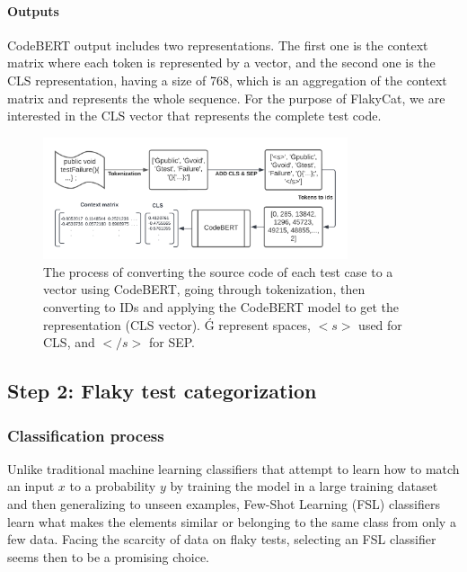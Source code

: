 \paragraph{Outputs}

CodeBERT output includes two representations. The first one is the context matrix where each token is represented by a vector, and the second one is the CLS representation, having a size of 768, which is an aggregation of the context matrix and represents the whole sequence.
For the purpose of FlakyCat, we are interested in the CLS vector that represents the complete test code.

 
\begin{figure}[htbp]
\centering
\includegraphics[width = 0.8\textwidth, scale=1]{figures/flakycat/codebert_transform.png}
\caption{The process of converting the source code of each test case to a vector using CodeBERT, going through tokenization, then converting to IDs and applying the CodeBERT model to get the representation (CLS vector). Ǵ represent spaces, $<s>$ used for CLS, and $</s>$ for SEP. }
\label{fig:using_codebert}
\end{figure}

\subsection{Step 2: Flaky test categorization}

\subsubsection{Classification process}

Unlike traditional machine learning classifiers that attempt to learn how to match an input $x$ to a probability $y$ by training the model in a large training dataset and then generalizing to unseen examples, Few-Shot Learning (FSL) classifiers learn what makes the elements similar or belonging to the same class from only a few data. Facing the scarcity of data on flaky tests, selecting an FSL classifier seems then to be a promising choice. 


